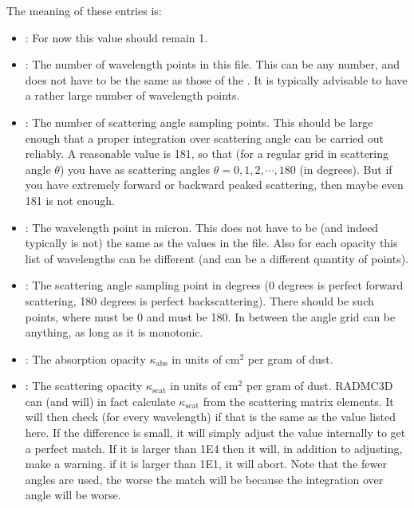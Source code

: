 \documentclass[letterpaper,10pt,english]{sphinxmanual}
\begin{document}
The meaning of these entries is:
\begin{itemize}
\item {} 
: For now this value should remain 1.

\item {} 
: The number of wavelength points in this file. This
can be any number, and does not have to be the same as those of the
. It is typically advisable to have a rather
large number of wavelength points.

\item {} 
: The number of scattering angle sampling points.
This should be large enough that a proper integration over scattering angle
can be carried out reliably. A reasonable value is 181, so that (for
a regular grid in scattering angle \(\theta\)) you have as scattering angles
\(\theta=0,1,2,\cdots,180\) (in degrees). But if you have extremely forward\sphinxhyphen{}
or backward peaked scattering, then maybe even 181 is not enough.

\item {} 
: The wavelength point  in micron. This does
not have to be (and indeed typically is not) the same as the values in the
 file. Also for each opacity this list of
wavelengths can be different (and can be a different quantity of points).

\item {} 
: The scattering angle
sampling point  in degrees (0 degrees is perfect forward scattering,
180 degrees is perfect backscattering). There should be 
such points, where  must be 0 and
 must be 180. In between the angle
grid can be anything, as long as it is monotonic.

\item {} 
: The absorption opacity \(\kappa_{\mathrm{abs}}\)
in units of \(\mathrm{cm}^2\) per gram of dust.

\item {} 
: The scattering opacity
\(\kappa_{\mathrm{scat}}\) in units of \(\mathrm{cm}^2\) per gram of dust. RADMC\sphinxhyphen{}3D can
(and will) in fact calculate \(\kappa_{\mathrm{scat}}\) from the scattering
matrix elements. It will then check (for every wavelength) if that is the
same as the value listed here. If the difference is small, it will simply
adjust the  value internally to get a
perfect match. If it is larger than 1E\sphinxhyphen{}4 then it will, in addition to
adjusting, make a warning. if it is larger than 1E\sphinxhyphen{}1, it will abort. Note
that the fewer angles are used, the worse the match will be because the
integration over angle will be worse.


\end{itemize}
\end{document}
